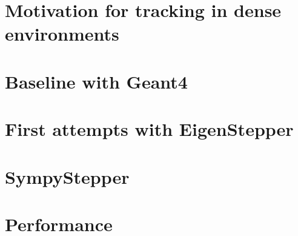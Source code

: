 
\section{Motivation for tracking in dense environments}


\section{Baseline with Geant4}


\section{First attempts with EigenStepper}


\section{SympyStepper}


\section{Performance}

